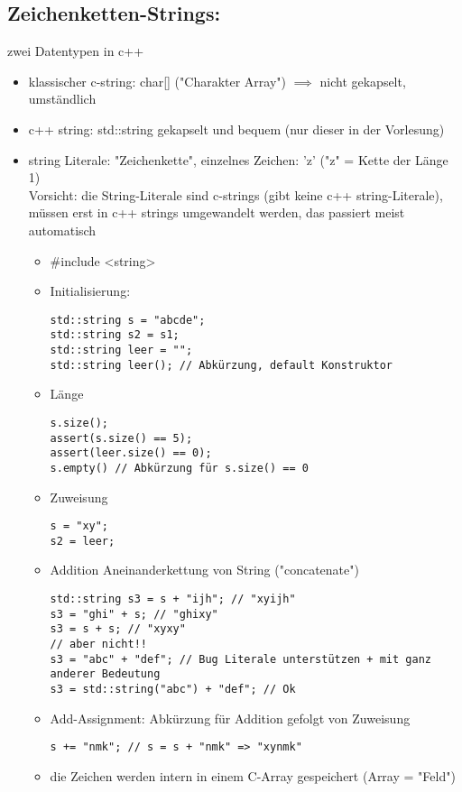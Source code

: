 \documentclass[a4paper]{scrartcl}
\theoremstyle{definition}
\theoremstyle{plain}
\theoremstyle{remark}
\theoremstyle{remark}
\begin{document}
\subsection{Zeichenketten-Strings:}
\label{sec-8-3}
zwei Datentypen in c++
\begin{itemize}
\item klassischer c-string: char[] ("Charakter Array") $\implies$ nicht gekapselt, umständlich
\item c++ string: std::string gekapselt und bequem (nur dieser in der Vorlesung)
\item string Literale: "Zeichenkette", einzelnes Zeichen: 'z' ("z" = Kette der Länge 1) \\
         Vorsicht: die String-Literale sind c-strings (gibt keine c++ string-Literale),
müssen erst in c++ strings umgewandelt werden, das passiert meist automatisch
\begin{itemize}
\item \#include <string>
\item Initialisierung:
\begin{verbatim}
std::string s = "abcde";
std::string s2 = s1;
std::string leer = "";
std::string leer(); // Abkürzung, default Konstruktor
\end{verbatim}
\item Länge
\begin{verbatim}
s.size();
assert(s.size() == 5);
assert(leer.size() == 0);
s.empty() // Abkürzung für s.size() == 0
\end{verbatim}
\item Zuweisung
\begin{verbatim}
s = "xy";
s2 = leer;
\end{verbatim}
\item Addition
Aneinanderkettung von String ("concatenate")
\begin{verbatim}
std::string s3 = s + "ijh"; // "xyijh"
s3 = "ghi" + s; // "ghixy"
s3 = s + s; // "xyxy"
// aber nicht!!
s3 = "abc" + "def"; // Bug Literale unterstützen + mit ganz anderer Bedeutung
s3 = std::string("abc") + "def"; // Ok
\end{verbatim}
\item Add-Assignment: Abkürzung für Addition gefolgt von Zuweisung
\begin{verbatim}
s += "nmk"; // s = s + "nmk" => "xynmk"
\end{verbatim}
\item die Zeichen werden intern in einem C-Array gespeichert (Array = "Feld") \\

\end{itemize}
\end{itemize}
\end{document}

